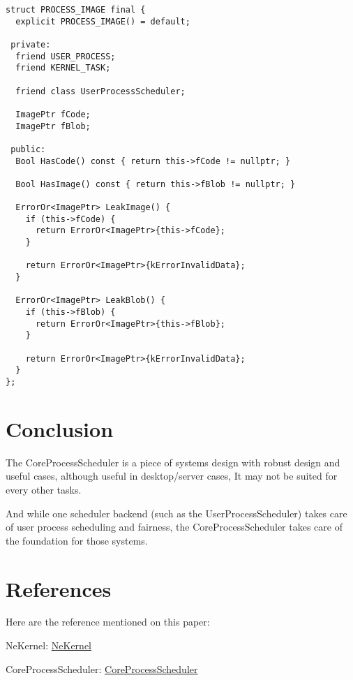 \documentclass{article}
\begin{document}
\begin{verbatim}
struct PROCESS_IMAGE final {
  explicit PROCESS_IMAGE() = default;

 private:
  friend USER_PROCESS;
  friend KERNEL_TASK;

  friend class UserProcessScheduler;

  ImagePtr fCode;
  ImagePtr fBlob;

 public:
  Bool HasCode() const { return this->fCode != nullptr; }

  Bool HasImage() const { return this->fBlob != nullptr; }

  ErrorOr<ImagePtr> LeakImage() {
    if (this->fCode) {
      return ErrorOr<ImagePtr>{this->fCode};
    }

    return ErrorOr<ImagePtr>{kErrorInvalidData};
  }

  ErrorOr<ImagePtr> LeakBlob() {
    if (this->fBlob) {
      return ErrorOr<ImagePtr>{this->fBlob};
    }

    return ErrorOr<ImagePtr>{kErrorInvalidData};
  }
};

\end{verbatim}

\section{Conclusion}

{The CoreProcessScheduler is a piece of systems design with robust design and useful cases, although useful in desktop/server cases, It may not be suited for every other tasks.}

{And while one scheduler backend (such as the UserProcessScheduler) takes care of user process scheduling and fairness, the CoreProcessScheduler takes care of the foundation for those systems.}

\section{References}

{Here are the reference mentioned on this paper:}

{NeKernel}: \href{https://github.com/nekernel-org/nekernel}{NeKernel}

{CoreProcessScheduler}: \href{https://github.com/nekernel-org/nekernel/blob/dev/dev/kernel/KernelKit/CoreProcessScheduler.h}{CoreProcessScheduler}
\end{document}
